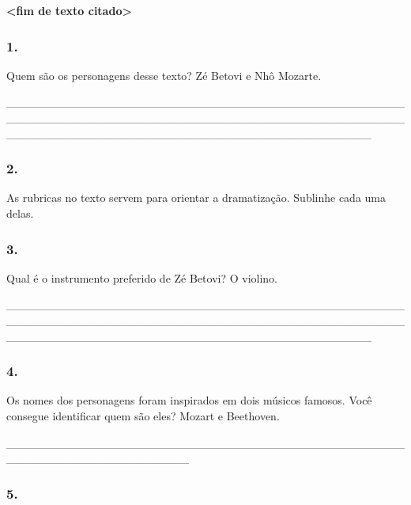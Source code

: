 \textbf{\textless{}fim de texto citado\textgreater{}}

\subsubsection{1. }\label{section-16}

Quem são os personagens desse texto? Zé Betovi e Nhô Mozarte.

\_\_\_\_\_\_\_\_\_\_\_\_\_\_\_\_\_\_\_\_\_\_\_\_\_\_\_\_\_\_\_\_\_\_\_\_\_\_\_\_\_\_\_\_\_\_\_\_\_\_\_\_\_\_\_\_\_\_\_\_\_\_\_\_\_\_\_\_\_\_\_\_\_\_\_\_\_\_\_\_\_\_\_\_\_\_\_\_\_\_\_\_\_\_\_\_\_\_\_\_\_\_\_\_\_\_\_\_\_\_\_\_\_\_\_\_\_\_\_\_\_\_\_\_\_\_\_\_\_\_\_\_\_\_\_\_\_\_\_\_

\subsubsection{2. }\label{section-17}

As rubricas no texto servem para orientar a dramatização. Sublinhe cada
uma delas.

\subsubsection{3. }\label{section-18}

Qual é o instrumento preferido de Zé Betovi? O violino.

\protect\hypertarget{_Hlk127362551}{}{}\_\_\_\_\_\_\_\_\_\_\_\_\_\_\_\_\_\_\_\_\_\_\_\_\_\_\_\_\_\_\_\_\_\_\_\_\_\_\_\_\_\_\_\_\_\_\_\_\_\_\_\_\_\_\_\_\_\_\_\_\_\_\_\_\_\_\_\_\_\_\_\_\_\_\_\_\_\_\_\_\_\_\_\_\_\_\_\_\_\_\_\_\_\_\_\_\_\_\_\_\_\_\_\_\_\_\_\_\_\_\_\_\_\_\_\_\_\_\_\_\_\_\_\_\_\_\_\_\_\_\_\_\_\_\_\_\_\_\_\_

\subsubsection{4. }\label{section-19}

Os nomes dos personagens foram inspirados em dois músicos famosos. Você
consegue identificar quem são eles? Mozart e Beethoven.

\_\_\_\_\_\_\_\_\_\_\_\_\_\_\_\_\_\_\_\_\_\_\_\_\_\_\_\_\_\_\_\_\_\_\_\_\_\_\_\_\_\_\_\_\_\_\_\_\_\_\_\_\_\_\_\_\_\_\_\_\_\_\_\_\_\_\_\_\_\_

\subsubsection{5. }\label{section-20}

